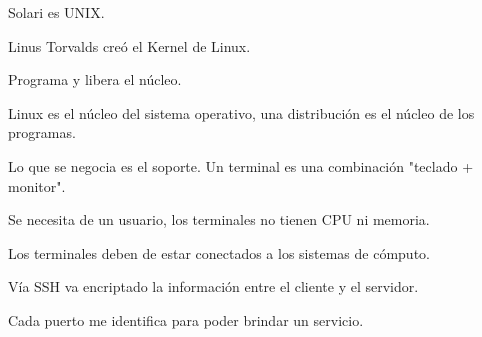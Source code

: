 \documentclass{memoir}
\begin{document}
Solari es UNIX.

Linus Torvalds creó el Kernel de Linux.

Programa y libera el núcleo.

Linux es el núcleo del sistema operativo, una distribución es el núcleo de los programas.

Lo que se negocia es el soporte.
Un terminal es una combinación "teclado + monitor".

Se necesita de un usuario, los terminales no tienen CPU ni memoria.

Los terminales deben de estar conectados a los sistemas de cómputo.


Vía SSH va encriptado la información entre el cliente y el servidor.

Cada puerto me identifica para poder brindar un servicio.

\end{document}
